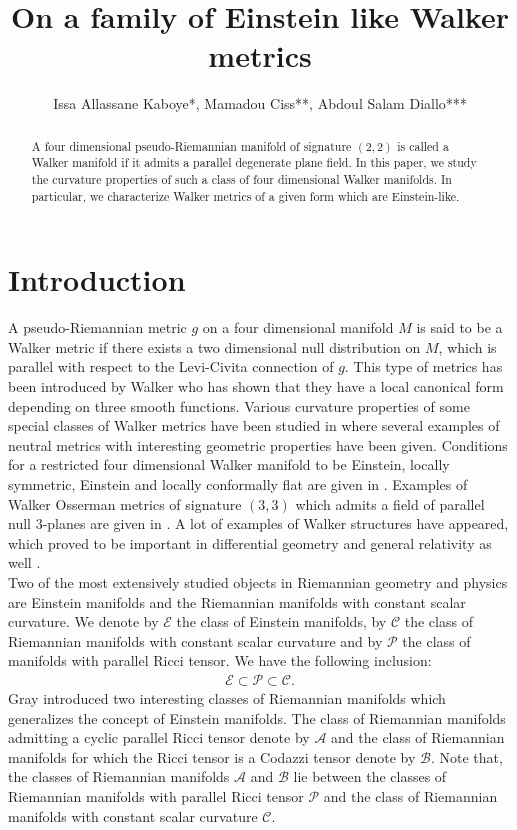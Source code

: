 \documentclass[reqno, 12pt]{amsart}
\title[On a family of Einstein like Walker metrics]{On a family of Einstein like Walker metrics}
\author[Issa Allassane Kaboye, Mamadou Ciss, Abdoul Salam Diallo]{Issa Allassane Kaboye*, Mamadou Ciss**, Abdoul Salam Diallo***}
\numberwithin{equation}{section}
\begin{document}
 
\begin{abstract}  
A four dimensional pseudo-Riemannian manifold of signature $(2, 2)$ 
is called a Walker manifold if it admits a parallel degenerate plane field. 
In this paper, we study the curvature properties of such a class of 
four dimensional Walker manifolds. In particular, we characterize Walker metrics of a given form which are Einstein-like.
\end{abstract}

\maketitle

\section{Introduction} 
\noindent
A pseudo-Riemannian metric $g$ on a four dimensional manifold $M$ is said to be 
a Walker metric if there exists a two dimensional null distribution on $M$, which
is parallel with respect to the Levi-Civita connection of $g$. This type of metrics 
has been introduced by Walker \cite{Walker1950} who has shown that they have 
a local canonical form depending on three smooth functions. Various curvature
properties of some special classes of Walker metrics have been studied 
in \cite{Brozos2009} where several examples of neutral metrics with interesting 
geometric properties have been given. Conditions for a restricted four dimensional 
Walker manifold to be Einstein, locally symmetric,  Einstein and locally conformally 
flat are given in \cite{Chaichi2005}.  Examples of  Walker Osserman metrics of signature 
$(3,3)$ which admits a field of parallel null $3$-planes are given in 
\cite{Diallo2011, Diallo2017}. A lot of examples of Walker structures 
have appeared, which proved to be important in differential geometry 
and general relativity as well .\\

\noindent
Two of the most extensively studied objects in Riemannian geometry 
and physics are Einstein manifolds and the Riemannian manifolds with constant scalar curvature. We denote by $\mathcal{E}$ the class of 
Einstein manifolds, by $\mathcal{C}$ the class of Riemannian manifolds with constant scalar curvature and by $\mathcal{P}$ the class of manifolds with parallel Ricci tensor. We have the following inclusion:
\begin{eqnarray*}
\mathcal{E} \subset \mathcal{P} \subset \mathcal{C}.
\end{eqnarray*}
Gray \cite{Gray1978} introduced two interesting classes of Riemannian manifolds which generalizes the concept of Einstein manifolds. The 
class of Riemannian manifolds admitting a cyclic parallel Ricci tensor denote by $\mathcal{A}$ and the class of Riemannian manifolds 
for which the Ricci tensor is a Codazzi tensor denote by $\mathcal{B}$. Note that, the classes of Riemannian manifolds $\mathcal{A}$
and $\mathcal{B}$ lie between the classes of Riemannian manifolds 
with parallel Ricci tensor $\mathcal{P}$ and the class of Riemannian manifolds with constant scalar curvature $\mathcal{C}$.\\
\end{document}
